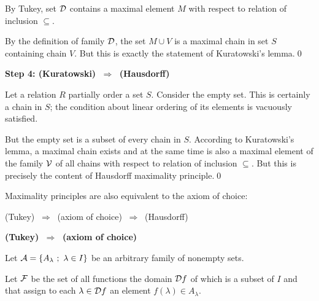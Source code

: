 \documentclass[11pt,paper=b5,footinclude,headinclude]{scrbook} %
\def\sledi {{~\Rightarrow~}}
\theoremstyle{remark}
\theoremstyle{definition} %
\theoremstyle{theorem} %
\begin{document}
By Tukey, set ${\cal D}$ contains a maximal element $M$ with respect to relation of inclusion $\subseteq$.

By the definition of family ${\cal D}$, the set $M\cup V$ is a maximal chain in set $S$ containing chain $V$.
But this is exactly the statement of Kuratowski's lemma.\qed

\bigskip
\textbf{ Step 4: (Kuratowski) $\sledi$ (Hausdorff)}

Let a relation $R$ partially order a set $S$.
Consider the empty set. This is certainly a chain in $S$; the condition about linear ordering of its elements is vacuously satisfied.

But the empty set is a subset of every chain in $S$. According to Kuratowski's lemma, a maximal chain exists and
at the same time is also a maximal element of the family ${\cal V}$ of all chains with respect to relation of inclusion $\subseteq$.
But this is precisely the content of Hausdorff maximality principle.\qed

%
%
\bigskip

Maximality principles are also equivalent to the axiom of choice:

(Tukey) $\sledi$ (axiom of choice) $\sledi$ (Hausdorff)


\bigskip
\textbf{ (Tukey) $\sledi$ (axiom of choice)}

Let ${\cal A} = \{A_\lambda~;~\lambda\in I\}$ be an arbitrary family of nonempty sets.

Let ${\cal F}$ be the set of all functions the domain ${\cal D}f$ of which is a subset of $I$ and
that assign to each $\lambda\in {\cal D}f$ an element $f(\lambda)\in A_\lambda$.
\end{document}

